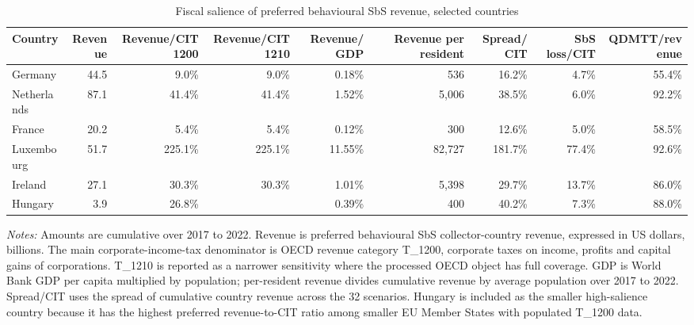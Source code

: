 \begin{table}[H]
\centering
\scriptsize
\caption[Fiscal salience of preferred behavioural SbS revenue]{Fiscal salience of preferred behavioural SbS revenue, selected countries}
\label{tab:country_fiscal_salience}
\begin{adjustbox}{max width=\textwidth,center}
\begin{tabular}{@{}lrrrrrrrr@{}}
\toprule
Country & Revenue & Revenue/CIT 1200 & Revenue/CIT 1210 & Revenue/GDP & Revenue per resident & Spread/CIT & SbS loss/CIT & QDMTT/revenue \\
\midrule
Germany & 44.5 &   9.0\% &   9.0\% &  0.18\% &    536 &  16.2\% &  4.7\% & 55.4\% \\
Netherlands & 87.1 &  41.4\% &  41.4\% &  1.52\% &  5,006 &  38.5\% &  6.0\% & 92.2\% \\
France & 20.2 &   5.4\% &   5.4\% &  0.12\% &    300 &  12.6\% &  5.0\% & 58.5\% \\
Luxembourg & 51.7 & 225.1\% & 225.1\% & 11.55\% & 82,727 & 181.7\% & 77.4\% & 92.6\% \\
Ireland & 27.1 &  30.3\% &  30.3\% &  1.01\% &  5,398 &  29.7\% & 13.7\% & 86.0\% \\
Hungary &  3.9 &  26.8\% &  &  0.39\% &    400 &  40.2\% &  7.3\% & 88.0\% \\
\bottomrule
\end{tabular}
\end{adjustbox}

\vspace{0.5em}
\begin{minipage}{0.96\textwidth}
\footnotesize\raggedright \textit{Notes:} Amounts are cumulative over 2017 to 2022. Revenue is preferred behavioural SbS collector-country revenue, expressed in US dollars, billions. The main corporate-income-tax denominator is OECD revenue category T\_1200, corporate taxes on income, profits and capital gains of corporations. T\_1210 is reported as a narrower sensitivity where the processed OECD object has full coverage. GDP is World Bank GDP per capita multiplied by population; per-resident revenue divides cumulative revenue by average population over 2017 to 2022. Spread/CIT uses the spread of cumulative country revenue across the 32 scenarios. Hungary is included as the smaller high-salience country because it has the highest preferred revenue-to-CIT ratio among smaller EU Member States with populated T\_1200 data.
\end{minipage}
\end{table}
